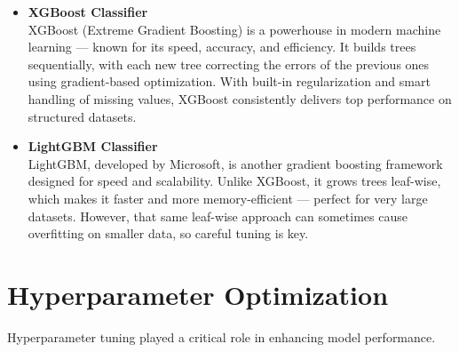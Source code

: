 \begin{itemize}
    \item \textbf{XGBoost Classifier}\\
    XGBoost (Extreme Gradient Boosting) is a powerhouse in modern machine learning — known for its speed, accuracy, and efficiency.
    It builds trees sequentially, with each new tree correcting the errors of the previous ones using gradient-based optimization.
    With built-in regularization and smart handling of missing values, XGBoost consistently delivers top performance on structured datasets.


    \item \textbf{LightGBM Classifier}\\
    LightGBM, developed by Microsoft, is another gradient boosting framework designed for speed and scalability.
    Unlike XGBoost, it grows trees leaf-wise, which makes it faster and more memory-efficient — perfect for very large datasets.
    However, that same leaf-wise approach can sometimes cause overfitting on smaller data, so careful tuning is key.


\end{itemize}


\section{Hyperparameter Optimization}\label{sec:hyperparameter-optimization2}
Hyperparameter tuning played a critical role in enhancing model performance.

